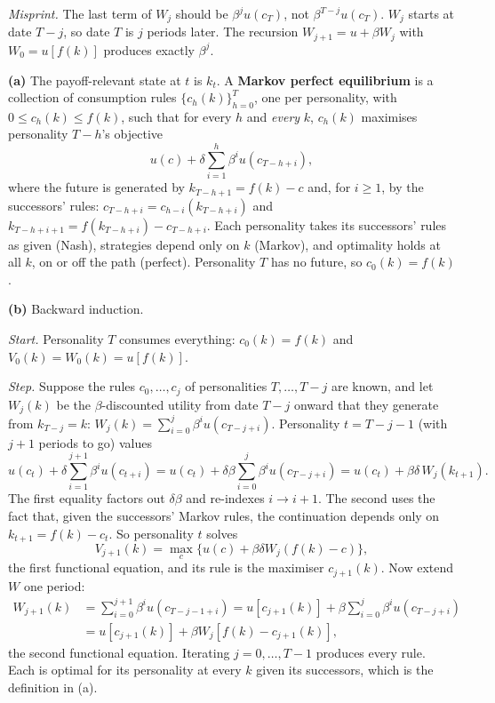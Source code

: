 \documentclass[12pt, letterpaper]{article}
\begin{document}
\begin{tcolorbox}[evenbox,title={Exercise 7.6 \quad Self-control}]
\emph{Misprint.} The last term of $W_j$ should be $\beta^{j}u(c_T)$, not $\beta^{T-j}u(c_T)$.
$W_j$ starts at date $T-j$, so date $T$ is $j$ periods later. The recursion
$W_{j+1}=u+\beta W_j$ with $W_0=u[f(k)]$ produces exactly $\beta^j$.

\textbf{(a)} The payoff-relevant state at $t$ is $k_t$. A \textbf{Markov perfect equilibrium} is a
collection of consumption rules $\{c_h(k)\}_{h=0}^{T}$, one per personality, with
$0\le c_h(k)\le f(k)$, such that for every $h$ and \emph{every} $k$, $c_h(k)$ maximises personality
$T-h$'s objective
\[
u(c)+\delta\sum_{i=1}^{h}\beta^iu(c_{T-h+i}),
\]
where the future is generated by $k_{T-h+1}=f(k)-c$ and, for $i\ge1$, by the successors' rules:
$c_{T-h+i}=c_{h-i}(k_{T-h+i})$ and $k_{T-h+i+1}=f(k_{T-h+i})-c_{T-h+i}$. Each personality takes its
successors' rules as given (Nash), strategies depend only on $k$ (Markov), and optimality holds at
all $k$, on or off the path (perfect). Personality $T$ has no future, so $c_0(k)=f(k)$.

\textbf{(b)} Backward induction.

\emph{Start.} Personality $T$ consumes everything: $c_0(k)=f(k)$ and $V_0(k)=W_0(k)=u[f(k)]$.

\emph{Step.} Suppose the rules $c_0,\dots,c_j$ of personalities $T,\dots,T-j$ are known, and let
$W_j(k)$ be the $\beta$-discounted utility from date $T-j$ onward that they generate from
$k_{T-j}=k$:
$W_j(k)=\sum_{i=0}^{j}\beta^iu(c_{T-j+i})$. Personality $t=T-j-1$ (with $j+1$ periods to go) values
\[
u(c_t)+\delta\sum_{i=1}^{j+1}\beta^iu(c_{t+i})
=u(c_t)+\delta\beta\sum_{i=0}^{j}\beta^{i}u(c_{T-j+i})
=u(c_t)+\beta\delta\,W_j(k_{t+1}).
\]
The first equality factors out $\delta\beta$ and re-indexes $i\to i+1$. The second uses the fact
that, given the successors' Markov rules, the continuation depends only on $k_{t+1}=f(k)-c_t$.
So personality $t$ solves
\[
V_{j+1}(k)=\max_{c}\{u(c)+\beta\delta W_j(f(k)-c)\},
\]
the first functional equation, and its rule is the maximiser $c_{j+1}(k)$. Now extend $W$ one
period:
\[
\begin{aligned}W_{j+1}(k)&=\sum_{i=0}^{j+1}\beta^iu(c_{T-j-1+i})=u[c_{j+1}(k)]+\beta\sum_{i=0}^{j}\beta^iu(c_{T-j+i})\\
&=u[c_{j+1}(k)]+\beta W_j[f(k)-c_{j+1}(k)],\end{aligned}
\]
the second functional equation. Iterating $j=0,\dots,T-1$ produces every rule. Each is optimal for
its personality at every $k$ given its successors, which is the definition in (a).


\end{tcolorbox}
\end{document}
